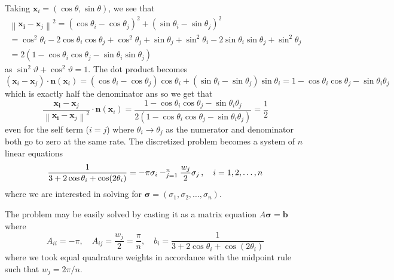 \documentclass[11pt]{article}
\let\sumop\relax
\newcommand{\norm}[1]{\left\lVert#1\right\rVert}
\begin{document}
Taking $\bm{x}_i = (\cos\theta, \sin\theta)$, we see that
\begin{multline*}
  \norm{\bm{x_i}-\bm{x}_j}^2
  = (\cos\theta_i - \cos\theta_j)^2 + (\sin\theta_i - \sin\theta_j)^2 \\
  = \cos^2\theta_i - 2\cos\theta_i\cos\theta_j + \cos^2\theta_j + \sin\theta_j + \sin^2\theta_i - 2\sin\theta_i\sin\theta_j + \sin^2\theta_j \\
   = 2(1 - \cos\theta_i\cos\theta_j - \sin\theta_i\sin\theta_j)
\end{multline*}
as $\sin^2\vartheta + \cos^2\vartheta = 1$. The dot product becomes
\begin{equation*}
  (\bm{x}_i - \bm{x}_j) \cdot \bm{n}(\bm{x}_i)
  = (\cos\theta_i - \cos\theta_j)\cos\theta_i + (\sin\theta_i - \sin\theta_j)\sin\theta_i
  = 1 - \cos\theta_i\cos\theta_j - \sin\theta_i\theta_j
\end{equation*}
which is exactly half the denominator ans so we get that
\begin{equation*}
  \frac{\bm{x_i}-\bm{x}_j}{\norm{\bm{x_i}-\bm{x}_j}^2} \cdot \bm{n}(\bm{x}_i)
  = \frac{1 - \cos\theta_i\cos\theta_j - \sin\theta_i\theta_j}{2(1 - \cos\theta_i\cos\theta_j - \sin\theta_i\theta_j)}
  = \frac{1}{2}
\end{equation*}
even for the self term ($i=j$) where $\theta_i \rightarrow \theta_j$ as the numerator and denominator both go to zero at the same rate. The discretized problem becomes a system of $n$ linear equations 
\begin{equation*}
  \frac{1}{3 + 2\cos\theta_i + \cos(2\theta_i)}
  = -\pi\sigma_i - \sumop_{j=1}^n \frac{w_j}{2} \sigma_j \, , \quad i = 1,2,\dots,n
\end{equation*}
where we are interested in solving for $\bm{\sigma} = (\sigma_1, \sigma_2, \dots, \sigma_n)$.

The problem may be easily solved by casting it as a matrix equation $A\bm{\sigma} = \bm{b}$ where
\begin{equation*}
  A_{ii} = -\pi, \quad
  A_{ij} = \frac{w_j}{2} = \frac{\pi}{n}, \quad
  b_i = \frac{1}{3 + 2\cos\theta_i + \cos(2\theta_i)}
\end{equation*}
where we took equal quadrature weights in accordance with the midpoint rule such that $w_j = 2\pi/n$.
\end{document}
